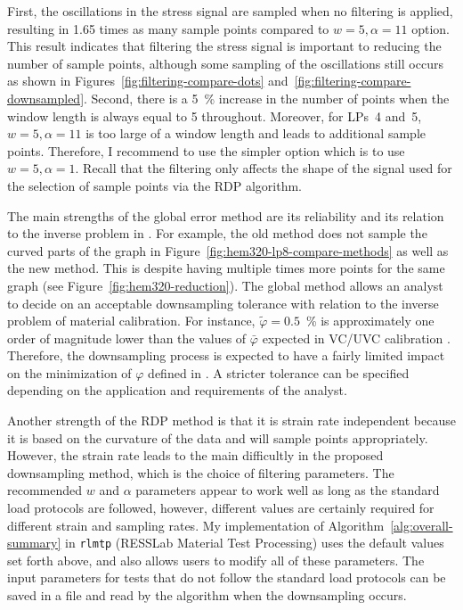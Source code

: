 \documentclass[a4paper,11pt]{article}
\begin{document}
First, the oscillations in the stress signal are sampled when no filtering is applied, resulting in 1.65 times as many sample points compared to $w = 5, \alpha=11$ option.
This result indicates that filtering the stress signal is important to reducing the number of sample points, although some sampling of the oscillations still occurs as shown in Figures~\ref{fig:filtering-compare-dots} and~\ref{fig:filtering-compare-downsampled}.
Second, there is a 5~\% increase in the number of points when the window length is always equal to 5 throughout.
Moreover, for LPs~4 and~5, $w = 5, \alpha=11$ is too large of a window length and leads to additional sample points.
Therefore, I recommend to use the simpler option which is to use $w = 5, \alpha=1$.
Recall that the filtering only affects the shape of the signal used for the selection of sample points via the RDP algorithm.

The main strengths of the global error method are its reliability and its relation to the inverse problem in \citet{deCastroeSousaConsistencySolvingInverse2020}.
For example, the old method does not sample the curved parts of the graph in Figure~\ref{fig:hem320-lp8-compare-methods} as well as the new method.
This is despite having multiple times more points for the same graph (see Figure~\ref{fig:hem320-reduction}).
The global method allows an analyst to decide on an acceptable downsampling tolerance with relation to the inverse problem of material calibration.
For instance, $\tilde{\varphi} = 0.5$~\% is approximately one order of magnitude lower than the values of $\bar{\varphi}$ expected in VC/UVC calibration \citep{deCastroeSousaConsistencySolvingInverse2020}.
Therefore, the downsampling process is expected to have a fairly limited impact on the minimization of $\varphi$ defined in \citet{deCastroeSousaConsistencySolvingInverse2020}.
A stricter tolerance can be specified depending on the application and requirements of the analyst.

Another strength of the RDP method is that it is strain rate independent because it is based on the curvature of the data and will sample points appropriately.
However, the strain rate leads to the main difficultly in the proposed downsampling method, which is the choice of filtering parameters.
The recommended $w$ and $\alpha$ parameters appear to work well as long as the standard load protocols are followed, however, different values are certainly required for different strain and sampling rates.
My implementation of Algorithm~\ref{alg:overall-summary} in \texttt{rlmtp} (RESSLab Material Test Processing) uses the default values set forth above, and also allows users to modify all of these parameters.
The input parameters for tests that do not follow the standard load protocols can be saved in a file and read by the algorithm when the downsampling occurs.
\end{document}
